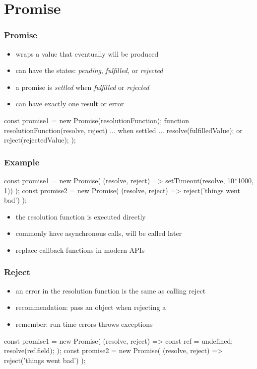 \section{Promise}
\begin{frame}[fragile] \frametitle{Promise}
\begin{itemize}
  \item wraps a value that eventually will be produced
  \item can have the states: \emph{pending}, \emph{fulfilled}, or \emph{rejected}
  \item a promise is \emph{settled} when  \emph{fulfilled} or \emph{rejected}
  \item can have exactly one result or error
\end{itemize}
\begin{CodeBox}{}
const promise1 = new Promise(resolutionFunction);
function resolutionFunction(resolve, reject) {
   ... when settled ...
   resolve(fulfilledValue);
       or
   reject(rejectedValue);
}
);
\end{CodeBox}
\end{frame}

\begin{frame}[fragile] \frametitle{Example}
\vspace{5mm}
\begin{CodeBox}{}
const promise1 = new Promise(
  (resolve, reject) => setTimeout(resolve, 10*1000, 1))
);
const promise2 = new Promise(
  (resolve, reject) => reject('things went bad')
);
\end{CodeBox}
\begin{itemize}
  \item the resolution function is executed directly
  \item commonly have asynchronous calls,  will be called later
  \item replace callback functions in modern APIs
\end{itemize}
\end{frame}

\begin{frame}[fragile] \frametitle{Reject}
\begin{itemize}
  \item {} an error in the resolution function is the same as calling reject
  \item recommendation: pass an  object when rejecting a 
  \item remember: run time errors throws exceptions
\end{itemize}
\vspace{5mm}
\begin{CodeBox}{}
const promise1 = new Promise(
  (resolve, reject) => {
    const ref = undefined;
    resolve(ref.field);
});
const promise2 = new Promise(
  (resolve, reject) => reject('things went bad')
);
\end{CodeBox}
\end{frame}

